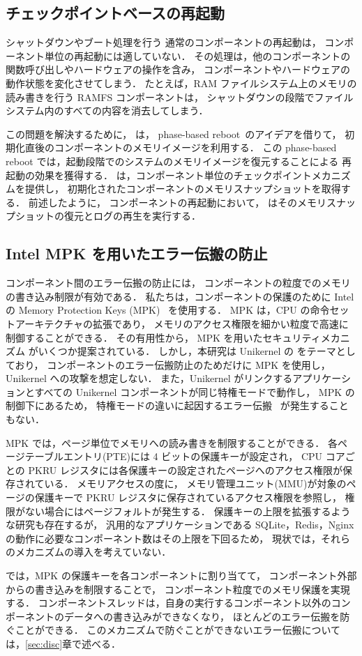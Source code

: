 \subsection{チェックポイントベースの再起動}

シャットダウンやブート処理を行う
通常のコンポーネントの再起動は，
コンポーネント単位の再起動には適していない．
その処理は，他のコンポーネントの関数呼び出しやハードウェアの操作を含み，
コンポーネントやハードウェアの動作状態を変化させてしまう．
たとえば，RAM ファイルシステム上のメモリの読み書きを行う RAMFS コンポーネントは，
シャットダウンの段階でファイルシステム内のすべての内容を消去してしまう．

この問題を解決するために，
\sysname は，
phase-based reboot~\cite{YamakitaEtAl-PBR}のアイデアを借りて，
初期化直後のコンポーネントのメモリイメージを利用する．
この phase-based reboot では，起動段階でのシステムのメモリイメージを復元することによる
再起動の効果を獲得する．
\sysname は，コンポーネント単位のチェックポイントメカニズムを提供し，
初期化されたコンポーネントのメモリスナップショットを取得する．
前述したように，
コンポーネントの再起動において，
\sysname はそのメモリスナップショットの復元とログの再生を実行する．


\subsection{Intel MPK を用いたエラー伝搬の防止}

コンポーネント間のエラー伝搬の防止には，
コンポーネントの粒度でのメモリの書き込み制限が有効である．
私たちは，コンポーネントの保護のために Intel の Memory Protection Keys (MPK)~\cite{Intel-Manual2023}
を使用する．
MPK は，CPU の命令セットアーキテクチャの拡張であり，
メモリのアクセス権限を細かい粒度で高速に制御することができる．
その有用性から，
MPK を用いたセキュリティメカニズム
がいくつか提案されている\cite{ParkEtAl-libmpk,HedayatiEtAl-Hodor,SchrammelEtAl-Donky,SartakovEtAl-ASPLOS21,LefeuvreEtAl-FlexOS}．
しかし，本研究は Unikernel の \rr をテーマとしており，
コンポーネントのエラー伝搬防止のためだけに MPK を使用し，
Unikernel への攻撃を想定しない．
また，Unikernel がリンクするアプリケーションとすべての Unikernel コンポーネントが同じ特権モードで動作し，
MPK の制御下にあるため，
特権モードの違いに起因するエラー伝搬~\cite{ConnorEtAl-PKUPitfalls,VoulimeneasEtAl-CERBERUS,SchrammelEtAl-Jenny}
が発生することもない．


MPK では，ページ単位でメモリへの読み書きを制限することができる．
各ページテーブルエントリ(PTE)には 4 ビットの保護キーが設定され，
CPU コアごとの PKRU レジスタには各保護キーの設定されたページへのアクセス権限が保存されている．
メモリアクセスの度に，
メモリ管理ユニット(MMU)が対象のページの保護キーで PKRU レジスタに保存されているアクセス権限を参照し，
権限がない場合にはページフォルトが発生する．
保護キーの上限を拡張するような研究\cite{ParkEtAl-libmpk,ChenEtAl-Shreds,GuEtAl-EPK}も存在するが，
汎用的なアプリケーションである SQLite，Redis，Nginx の動作に必要なコンポーネント数はその上限を下回るため，
現状では，それらのメカニズムの導入を考えていない．

\sysname では，MPK の保護キーを各コンポーネントに割り当てて，
コンポーネント外部からの書き込みを制限することで，
コンポーネント粒度でのメモリ保護を実現する．
コンポーネントスレッドは，自身の実行するコンポーネント以外のコンポーネントのデータへの書き込みができなくなり，
ほとんどのエラー伝搬を防ぐことができる．
このメカニズムで防ぐことができないエラー伝搬については，\ref{sec:disc}章で述べる．


